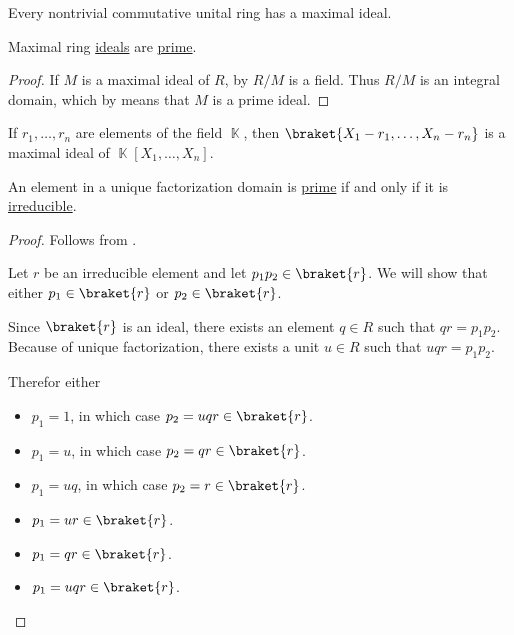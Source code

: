 \begin{theorem}\label{thm:krulls_theorem}\mcite\cite{Hodges1979}
  Every nontrivial commutative unital ring has a maximal ideal.
\end{theorem}

\begin{proposition}\label{thm:maximal_ideals_are_prime}
  Maximal ring \hyperref[def:maximal_ring_ideal]{ideals} are \hyperref[def:prime_ring_ideal]{prime}.
\end{proposition}
\begin{proof}
  If \( M \) is a maximal ideal of \( R \), by  \( R / M \) is a field. Thus \( R / M \) is an integral domain, which by  means that \( M \) is a prime ideal.
\end{proof}

\begin{proposition}\label{thm:field_maximal_ideal_representation}\mcite\cite[exer. 8.1]{Коцев2016}
  If \( r_1, \ldots, r_n \) are elements of the field \( \BbbK \), then \( \braket{X_1 - r_1, \ldots, X_n - r_n} \) is a maximal ideal of \( \BbbK[X_1, \ldots, X_n] \).
\end{proposition}

\begin{proposition}\label{thm:ufd_prime_iff_irreducible}
  An element in a unique factorization domain is \hyperref[def:prime_ring_ideal]{prime} if and only if it is \hyperref[def:irreducible_ring_element]{irreducible}.
\end{proposition}
\begin{proof}
  \Sufficiency Follows from .

  \Necessity Let \( r \) be an irreducible element and let \( p_1 p_2 \in \braket{r} \). We will show that either  \( p_1 \in \braket{r} \) or \( p_2 \in \braket{r} \).

  Since \( \braket{r} \) is an ideal, there exists an element \( q \in R \) such that \( qr = p_1 p_2 \). Because of unique factorization, there exists a unit \( u \in R \) such that \( uqr = p_1 p_2  \).

  Therefor either
  \begin{itemize}
    \item \( p_1 = 1 \), in which case \( p_2 = uqr \in \braket{r} \).
    \item \( p_1 = u \), in which case \( p_2 = qr \in \braket{r} \).
    \item \( p_1 = uq \), in which case \( p_2 = r \in \braket{r} \).
    \item \( p_1 = ur \in \braket{r} \).
    \item \( p_1 = qr \in \braket{r} \).
    \item \( p_1 = uqr \in \braket{r} \).
  \end{itemize}
\end{proof}

